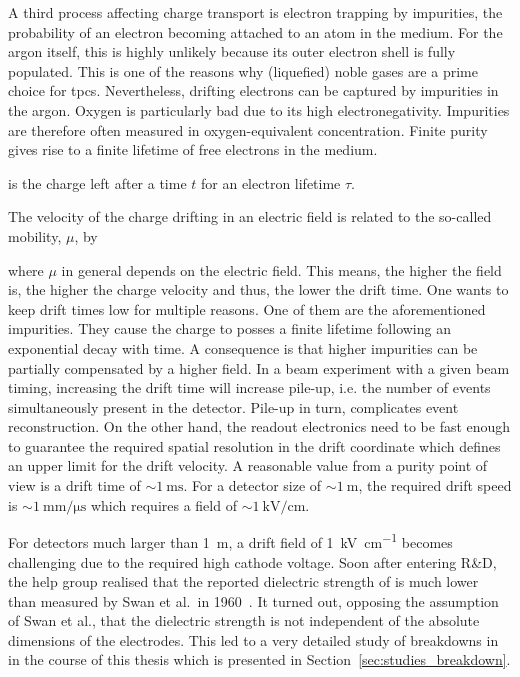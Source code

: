 A third process affecting charge transport is electron trapping by impurities, the probability of an electron becoming attached to an atom in the medium.
For the argon itself, this is highly unlikely because its outer electron shell is fully populated.
This is one of the reasons why (liquefied) noble gases are a prime choice for \glspl{tpc}.
Nevertheless, drifting electrons can be captured by impurities in the argon.
Oxygen is particularly bad due to its high electronegativity.
Impurities are therefore often measured in oxygen-equivalent concentration.
Finite purity gives rise to a finite lifetime of free electrons in the medium.
is the charge left after a time $t$ for an electron lifetime $\tau$.

The velocity of the charge drifting in an electric field is related to the so-called mobility, $\mu$, by
where $\mu$ in general depends on the electric field.
This means, the higher the field is, the higher the charge velocity and thus, the lower the drift time.
One wants to keep drift times low for multiple reasons.
One of them are the aforementioned impurities.
They cause the charge to posses a finite lifetime following an exponential decay with time.
A consequence is that higher impurities can be partially compensated by a higher field.
In a beam experiment with a given beam timing, increasing the drift time will increase pile-up, i.e. the number of events simultaneously present in the detector.
Pile-up in turn, complicates event reconstruction.
On the other hand, the readout electronics need to be fast enough to guarantee the required spatial resolution in the drift coordinate which defines an upper limit for the drift velocity.
A reasonable value from a purity point of view is a drift time of $\sim{\SI{1}{\milli\second}}$.
For a detector size of $\sim{\SI{1}{\metre}}$, the required drift speed is $\sim{\SI{1}{\milli\metre\per\micro\second}}$ which requires a field of $\sim{\SI{1}{\kilo\volt\per\centi\metre}}$.

For detectors much larger than \SI{1}{\metre}, a drift field of \SI{1}{\kilo\volt\per\centi\metre} becomes challenging due to the required high cathode voltage.
Soon after entering \lartpc{} R\&D, the \gls{help} group realised that the reported dielectric strength of \lar{} is much lower~\cite{breakdown_14} than measured by Swan et al.\ in 1960~\cite{swan1, swan2}.
It turned out, opposing the assumption of Swan et al., that the dielectric strength is not independent of the absolute dimensions of the electrodes.
This led to a very detailed study of breakdowns in \lar{} in the course of this thesis which is presented in Section~\ref{sec:studies_breakdown}.


